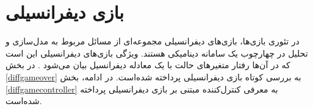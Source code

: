 \chapter{ بازی دیفرانسیلی}
در تئوری بازی‌ها، بازی‌های دیفرانسیلی مجموعه‌ای از مسائل مربوط به مدل‌سازی و تحلیل در چهارچوب یک سامانه دینامیکی هستند. ویژگی بازی‌های دیفرانسیلی این است که در آن‌ها رفتار متغیرهای حالت با یک معادله دیفرانسیل بیان می‌شود
\cite{diff_game}.
در بخش
\ref{diffgameover}
به بررسی کوتاه بازی دیفرانسیلی پرداخته شده‌است. در ادامه، بخش
\ref{diffgamecontroller}
به معرفی کنترل‌کننده  مبتنی بر بازی دیفرانسیلی پرداخته شده‌است.



